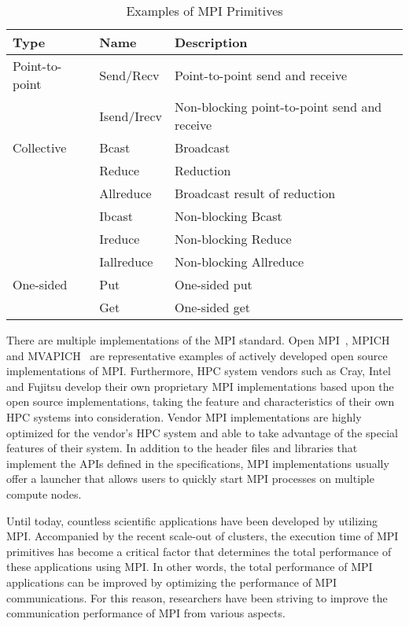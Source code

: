 \begin{table}
    \centering
    \caption{Examples of MPI Primitives}%
    \label{tbl:mpi-primitives}
\begin{tabular}{@{}lll@{}}
\toprule
Type           & Name        & Description \\ \midrule
Point-to-point & Send/Recv   & Point-to-point send and receive              \\
               & Isend/Irecv & Non-blocking point-to-point send and receive \\
\midrule
Collective     & Bcast       & Broadcast                                    \\
               & Reduce      & Reduction                                    \\
               & Allreduce   & Broadcast result of reduction                \\
               & Ibcast      & Non-blocking Bcast                           \\
               & Ireduce     & Non-blocking Reduce                          \\
               & Iallreduce  & Non-blocking Allreduce                       \\
\midrule
One-sided      & Put         & One-sided put                                \\
               & Get         & One-sided get                                \\
\bottomrule
\end{tabular}
\end{table}

There are multiple implementations of the MPI standard. Open
MPI~\cite{Squyres2005}, MPICH~\cite{Gropp2002} and MVAPICH~\cite{mvapich} are
representative examples of
actively developed open source implementations of MPI\@.
Furthermore, HPC system vendors such as Cray, Intel and Fujitsu develop their
own proprietary MPI implementations based upon the open source
implementations, taking the feature and characteristics of their own HPC
systems into consideration. Vendor MPI implementations are highly optimized
for the vendor's HPC system and able to take advantage of the special features
of their system. In addition to the header files and libraries that implement
the APIs defined in the specifications, MPI implementations usually offer a
launcher that allows users to quickly start MPI processes on multiple compute
nodes.

Until today, countless scientific applications have been developed by
utilizing MPI\@. Accompanied by the recent scale-out of clusters, the
execution time of MPI primitives has become a critical factor that determines
the total performance of these applications using MPI\@. In other words, the
total performance of MPI applications can be improved by optimizing the
performance of MPI communications. For this reason, researchers have been
striving to improve the communication performance of MPI from various aspects.

